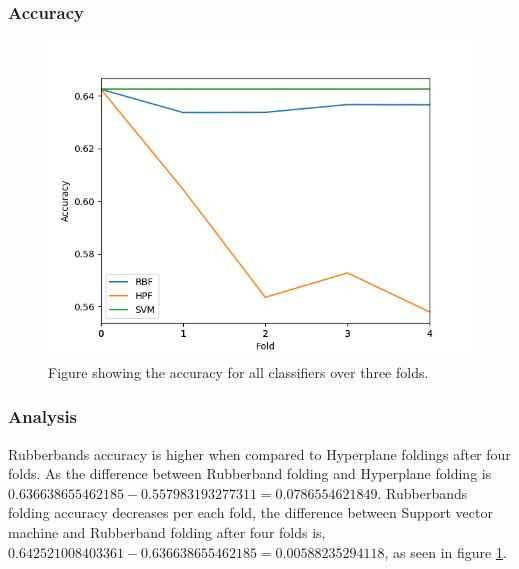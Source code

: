 \documentclass[a4paper,twoside]{bth}
\begin{document}
\subsubsection{Accuracy}
\begin{figure}[!htb]
\centering
\includegraphics[scale=0.7]{images/result-liver/Accuracy.png}
   \caption{Figure showing the accuracy for all classifiers over three folds.}
   \label{fig:liver-accuracy}
\end{figure}

\FloatBarrier
\subsubsection{Analysis}
Rubberbands accuracy is higher when compared to Hyperplane foldings after four folds. As the difference between Rubberband folding and Hyperplane folding is $0.636638655462185
- 0.557983193277311 = 0.0786554621849$. Rubberbands folding accuracy decreases per each fold, the difference between Support vector machine and Rubberband folding after four folds is, $0.642521008403361 - 0.636638655462185 = 0.00588235294118$, as seen in figure \ref{fig:liver-accuracy}. 

\clearpage
\FloatBarrier
\end{document}
